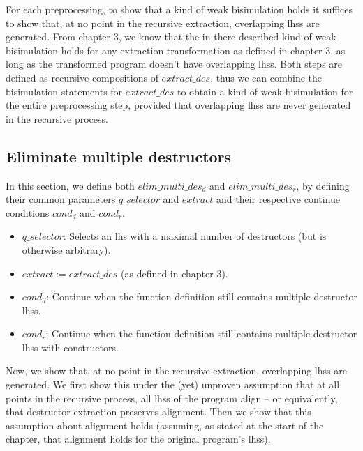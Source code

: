 For each preprocessing, to show that a kind of weak bisimulation holds it suffices to show that, at no point in the recursive extraction, overlapping lhss are generated. From chapter 3, we know that the in there described kind of weak bisimulation holds for any extraction transformation as defined in chapter 3, as long as the transformed program doesn't have overlapping lhss. Both steps are defined as recursive compositions of $extract\_des$, thus we can combine the bisimulation statements for $extract\_des$ to obtain a kind of weak bisimulation for the entire preprocessing step, provided that overlapping lhss are never generated in the recursive process.

\subsection{Eliminate multiple destructors}

In this section, we define both $elim\_multi\_des_d$ and $elim\_multi\_des_r$, by defining their common parameters $q\_selector$ and $extract$ and their respective continue conditions $cond_d$ and $cond_r$.

\begin{itemize}
\item $q\_selector$: Selects an lhs with a maximal number of destructors (but is otherwise arbitrary).

\item $extract := extract\_des$ (as defined in chapter 3).

\item $cond_d$: Continue when the function definition still contains multiple destructor lhss.

\item $cond_r$: Continue when the function definition still contains multiple destructor lhss with constructors.
\end{itemize}

Now, we show that, at no point in the recursive extraction, overlapping lhss are generated. We first show this under the (yet) unproven assumption that at all points in the recursive process, all lhss of the program align -- or equivalently, that destructor extraction preserves alignment. Then we show that this assumption about alignment holds (assuming, as stated at the start of the chapter, that alignment holds for the original program's lhss).

